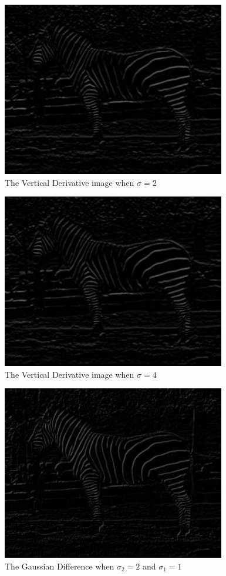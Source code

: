 \documentclass[11pt,psfig]{article}
\begin{document}
\begin{figure}[H]
\centering
\includegraphics[height=3in]{sigma_2_vertDeriv_zebra_small.jpg}
\caption{The Vertical Derivative image when $\sigma=2$}
\end{figure}

\begin{figure}[H]
\centering
\includegraphics[height=3in]{sigma_4_vertDeriv_zebra_small.jpg}
\caption{The Vertical Derivative image when $\sigma=4$}
\end{figure}

\begin{figure}[H]
\centering
\includegraphics[height=3in]{sigma2_2_sigma1_1_gaussDiff_zebra_small.jpg}
\caption{The Gaussian Difference when $\sigma_2=2$ and $\sigma_1=1$}
\end{figure}
\end{document}
